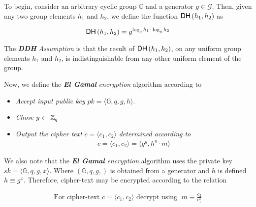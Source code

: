 \documentclass[../CryptoHW3.tex]{subfiles}
\begin{document}
\begin{flushleft}



 To begin, consider an arbitrary cyclic group $\mathbb{G}$ and a generator $g \in \mathcal{G}$.  Then, given any two group elements $h_1$ and $h_2$, we define the function $\text{{\fontfamily{phv}\selectfont DH}} \left( h_1, h_2 \right)$ as

\begin{align}
  \text{{\fontfamily{phv}\selectfont DH}} \left( h_1, h_2 \right) = g^{\log_g h_1 \, \cdot \, \log_g h_2}
\end{align}

The \textbf{\emph{DDH}} \emph{Assumption} is that the result of $\text{{\fontfamily{phv}\selectfont DH}} \left( h_1, h_2 \right)$, on any uniform group elements $h_1$ and $h_2$, is indistinguishable from any other uniform element of the group. \newline


Now, we define the \textbf{\emph{El Gamal}} \emph{encryption} algorithm according to 

\begin{itemize}
  \item \emph{Accept input public key} $pk = \langle \mathbb{G}, q, g, h \rangle$.
  \item \emph{Chose} $y \leftarrow \mathbb{Z}_q$ 
  \item \emph{Output the cipher text} $c = \langle c_1, c_2 \rangle$ \emph{determined according to}
  	\begin{align*}
	  c = \langle c_1, c_2 \rangle = \langle g^y, h^y \cdot m \rangle
	\end{align*}
\end{itemize}

We also note that the \textbf{\emph{El Gamal}} \emph{encryption} algorithm uses the private key $sk = \langle \mathbb{G}, q, g, x \rangle$.  Where $\left( \mathbb{G}, q, g, \right)$ is obtained from a generator and $h$ is defined $h \equiv g^x$.  Therefore, cipher-text may be encrypted according to the relation

\begin{align*}
  \text{For cipher-text } c = \langle c_1, c_2 \rangle \text{ decrypt using } \; \boxed{m \equiv \frac{c_2}{c_1^x}}
\end{align*}




















\end{flushleft}
\end{document}
